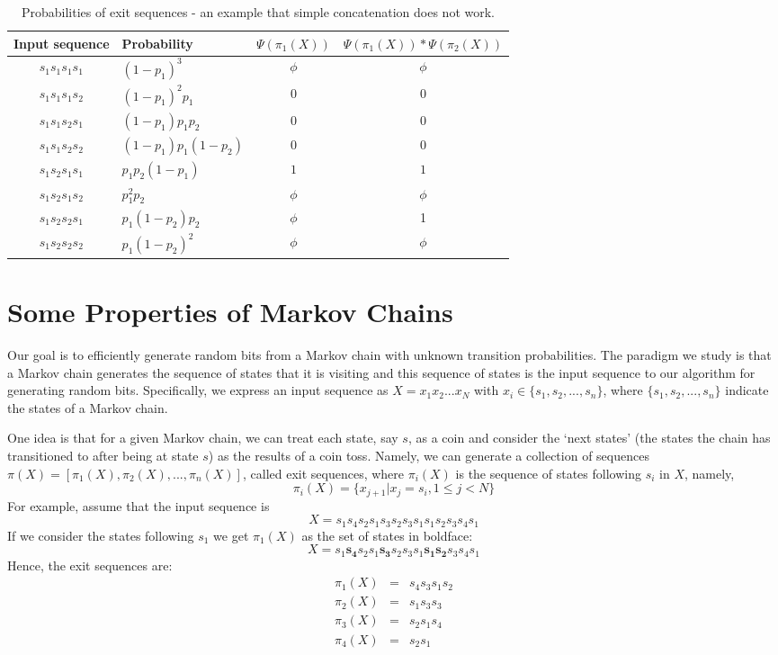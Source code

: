 \documentclass[journal]{IEEEtran}
\begin{document}
\begin{table*}
  \centering
  \begin{tabular}{|c|l|c|c|}
  \hline
\textrm{Input sequence}\quad & \textrm{Probability}\quad & $\Psi(\pi_1(X))$ & $\Psi(\pi_1(X))*\Psi(\pi_2(X))$\\
\hline
  $s_1s_1s_1s_1$& $(1-p_1)^3$ & $\phi$& $\phi$\\
  $s_1s_1s_1s_2$& $(1-p_1)^2 p_1$ & $0$ & $0$\\
  $s_1s_1s_2s_1$& $(1-p_1)p_1p_2$ & $0$& $0$\\
  $s_1s_1s_2s_2$& $(1-p_1)p_1(1-p_2)$ & $0$& $0$\\
  $s_1s_2s_1s_1$& $p_1p_2(1-p_1)$ & $1$& $1$\\
  $s_1s_2s_1s_2$& $p_1^2p_2$ & $\phi$& $\phi$\\
  $s_1s_2s_2s_1$& $p_1(1-p_2)p_2$ & $\phi$ & 1\\
  $s_1s_2s_2s_2$& $p_1(1-p_2)^2$ & $\phi$ & $\phi$\\
  \hline
\end{tabular}
\caption{Probabilities of exit sequences - an example that simple concatenation does not work.}\label{table11}
\end{table*}

\section{Some Properties of Markov Chains}
\label{Section_MainLemma}

Our goal is to efficiently generate random bits from a Markov chain with unknown transition probabilities.
The paradigm we study is that a Markov chain generates the sequence of states that it is visiting and
this sequence of states is the input sequence to our algorithm for generating random bits.
Specifically, we express an input sequence as $X=x_1x_2...x_N$ with $x_i\in \{s_1,s_2,...,s_n\}$, where
$\{s_1,s_2,...,s_n\}$ indicate the states of a Markov chain.

One idea is that for a given Markov chain, we can treat each state, say $s$, as a coin and consider the `next states' (the states the chain has transitioned to after being at state $s$) as the results of a coin toss. Namely, we can generate a collection of sequences $\pi(X)=[\pi_1(X),\pi_2(X),...,\pi_n(X)]$, called exit sequences, where $\pi_i(X)$ is the sequence of states following $s_i$ in $X$, namely,
$$\pi_i(X) =\{x_{j+1}|x_j=s_i, 1\leq j<N\}$$
For example, assume that the input sequence is
$$X=s_1 s_4 s_2 s_1 s_3 s_2 s_3 s_1 s_1 s_2 s_3 s_4 s_1$$
If we consider the states following $s_1$ we get $\pi_1(X)$ as the set of states in boldface:
$$X = s_1 \textbf{s}_\textbf{{4}} s_2 s_1 \textbf{s}_\textbf{{3}} s_2 s_3 s_1 \textbf{s}_\textbf{{1}} \textbf{s}_\textbf{{2}} s_3 s_4 s_1$$
Hence, the exit sequences are:
\begin{eqnarray*}
\pi_1(X)&=&s_4 s_3 s_1s_2\\
\pi_2(X)&=&s_1 s_3 s_3\\
\pi_3(X)&=&s_2s_1 s_4\\
\pi_4(X)&=&s_2 s_1
\end{eqnarray*}
\end{document}
